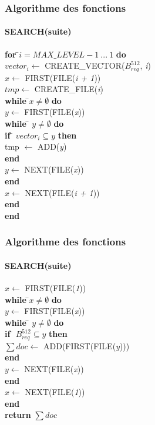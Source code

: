 \documentclass[hyperref={pdfpagemode=FullScreen,colorlinks=true},xcolor=pst,dvips]{beamer}\usepackage[french]{babel}
\begin{document}
	\begin{frame}[shrink]
		\frametitle{Algorithme des fonctions}
		\framesubtitle{SEARCH(suite)}
		\begin{framed}
			\begin{tabbing}
				\textbf{for }\=$i = MAX\_LEVEL - 1\ ...\ 1$ \textbf{do}\\
					\> $vector_i \leftarrow$ CREATE\_VECTOR($B^{512}_{req}$, \textit{i})\\
					\> $x \leftarrow$ FIRST(FILE(\textit{i + 1}))\\
					\> $tmp \leftarrow$ CREATE\_FILE(\textit{i})\\
					\> \textbf{while }\=$x \neq \emptyset$\textbf{ do}\\
					\> \> $y \leftarrow$ FIRST(FILE(\textit{x}))\\
					\> \> \textbf{while }\= $y \neq \emptyset$ \textbf{ do}\\
					\> \> \> \textbf{if }\= $vector_i \subseteq y$\textbf{ then}\\
					\> \> \> \> tmp $\leftarrow$ ADD(\textit{y})\\
					\> \> \> \textbf{end}\\
					\> \> \> $y \leftarrow$ NEXT(FILE(\textit{x}))\\
					\> \> \textbf{end}\\
					\> \> $x \leftarrow$ NEXT(FILE(\textit{i + 1}))\\
					\> \textbf{end}\\
			\textbf{end}	
			\end{tabbing}
		\end{framed}
	\end{frame}
	
	\begin{frame}[shrink]
		\frametitle{Algorithme des fonctions}
		\framesubtitle{SEARCH(suite)}
		\begin{framed}
			\begin{tabbing}
				$x \leftarrow$ FIRST(FILE(\textit{1}))\\
			\textbf{while }\=$x \neq \emptyset$\textbf{ do}\\
					\> $y \leftarrow $ FIRST(FILE(\textit{x}))\\
					\> \textbf{while }\= $y \neq \emptyset$\textbf{ do}\\
					\> \> \textbf{if }\= $B^{512}_{req} \subseteq y$\textbf{ then}\\
					\> \> \> $\sum doc \leftarrow$ ADD(FIRST(FILE(\textit{y})))\\
					\> \> \textbf{end}\\
					\> \> $y \leftarrow$ NEXT(FILE(\textit{x}))\\
					\> \textbf{end}\\
					\> $x \leftarrow$ NEXT(FILE(\textit{1}))\\
			\textbf{end}\\
			\textbf{return} $\sum doc$
			\end{tabbing}
		\end{framed}
	\end{frame}
	
\end{document}
